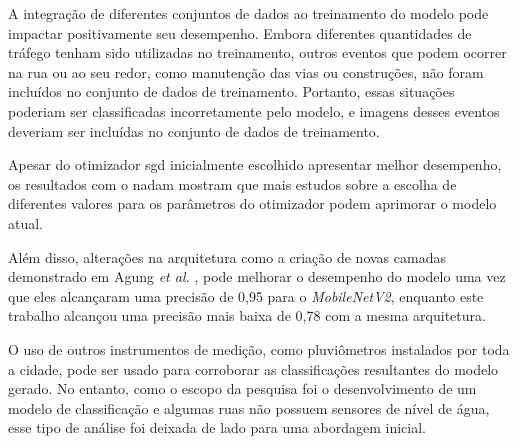 A integração de diferentes conjuntos de dados ao treinamento do modelo pode impactar positivamente seu desempenho.
Embora diferentes quantidades de tráfego tenham sido utilizadas no treinamento, outros eventos que podem ocorrer na rua ou ao seu redor, como manutenção das vias ou construções, 
não foram incluídos no conjunto de dados de treinamento. 
Portanto, essas situações poderiam ser classificadas incorretamente pelo modelo, e imagens desses eventos deveriam ser incluídas no conjunto de dados de treinamento.

Apesar do otimizador \acrshort{sgd} inicialmente escolhido apresentar melhor desempenho, 
os resultados com o \acrshort{nadam} mostram que mais estudos sobre a escolha de diferentes valores para os parâmetros do otimizador podem aprimorar o modelo atual.

Além disso, alterações na arquitetura como a criação de novas camadas demonstrado em Agung \textit{et al.} \cite{agung2023}, 
pode melhorar o desempenho do modelo uma vez que eles alcançaram uma precisão de 0,95 para o \textit{MobileNetV2}, 
enquanto este trabalho alcançou uma precisão mais baixa de 0,78 com a mesma arquitetura.

O uso de outros instrumentos de medição, como pluviômetros instalados por toda a cidade, pode ser usado para corroborar as classificações resultantes do modelo gerado. 
No entanto, como o escopo da pesquisa foi o desenvolvimento de um modelo de classificação e algumas ruas não possuem sensores de nível de água, 
esse tipo de análise foi deixada de lado para uma abordagem inicial.

